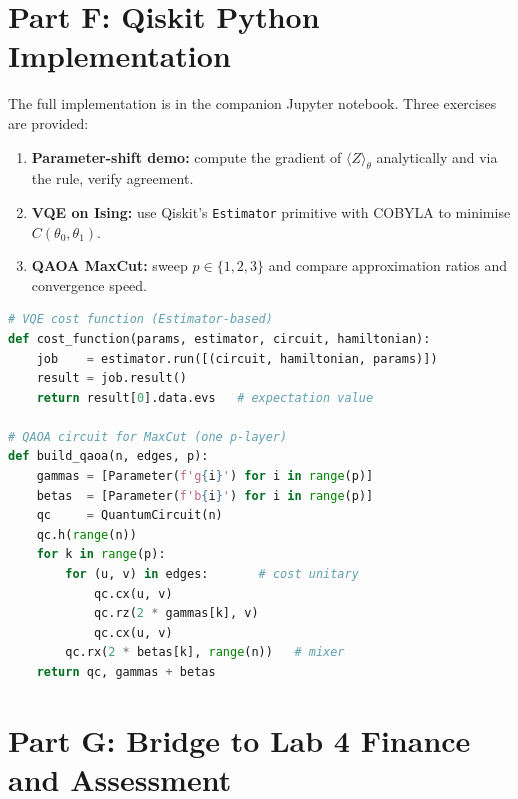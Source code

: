 \documentclass[a4paper,11pt]{article}
\begin{document}
\section{Part F: Qiskit Python Implementation}

The full implementation is in the companion Jupyter notebook.
Three exercises are provided:

\begin{enumerate}
    \item \textbf{Parameter-shift demo:} compute the gradient of
          $\langle Z\rangle_\theta$ analytically and via the rule,
          verify agreement.
    \item \textbf{VQE on Ising:} use Qiskit's \texttt{Estimator} primitive
          with COBYLA to minimise $C(\theta_0, \theta_1)$.
    \item \textbf{QAOA MaxCut:} sweep $p \in \{1,2,3\}$ and compare
          approximation ratios and convergence speed.
\end{enumerate}

\begin{tcolorbox}[colback=green!5!white,colframe=green!75!black,
    title=Key Code Structure, fonttitle=\bfseries]
\begin{lstlisting}[language=Python]
# VQE cost function (Estimator-based)
def cost_function(params, estimator, circuit, hamiltonian):
    job    = estimator.run([(circuit, hamiltonian, params)])
    result = job.result()
    return result[0].data.evs   # expectation value

# QAOA circuit for MaxCut (one p-layer)
def build_qaoa(n, edges, p):
    gammas = [Parameter(f'g{i}') for i in range(p)]
    betas  = [Parameter(f'b{i}') for i in range(p)]
    qc     = QuantumCircuit(n)
    qc.h(range(n))
    for k in range(p):
        for (u, v) in edges:       # cost unitary
            qc.cx(u, v)
            qc.rz(2 * gammas[k], v)
            qc.cx(u, v)
        qc.rx(2 * betas[k], range(n))   # mixer
    return qc, gammas + betas
\end{lstlisting}
\end{tcolorbox}

\section{Part G: Bridge to Lab 4 Finance and Assessment}
\end{document}

